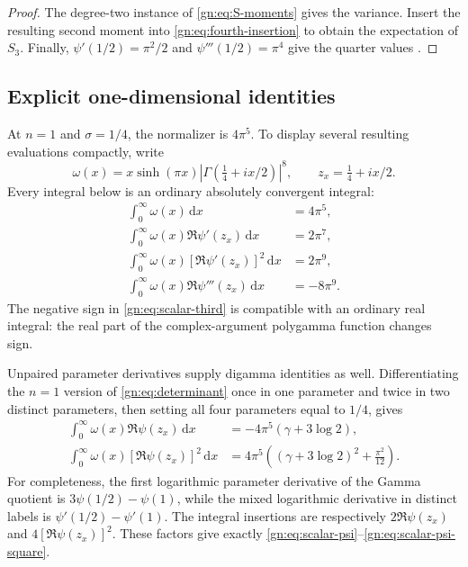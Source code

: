 \documentclass[11pt,a4paper]{article}
\numberwithin{equation}{section}
\theoremstyle{definition}
\theoremstyle{remark}
\newcommand{\dd}{\,\mathrm d}
\begin{document}
\begin{proof}
The degree-two instance of \eqref{gn:eq:S-moments} gives the variance.
Insert the resulting second moment into
\eqref{gn:eq:fourth-insertion} to obtain the expectation of $S_3$.
Finally, $\psi'(1/2)=\pi^2/2$ and $\psi'''(1/2)=\pi^4$ give the
quarter values \cite{dlmfpolygamma}.
\end{proof}

\subsection{Explicit one-dimensional identities}

At $n=1$ and $\sigma=1/4$, the normalizer is $4\pi^5$.  To display
several resulting evaluations compactly, write
\[
 \omega(x)=x\sinh(\pi x)|\Gamma(\tfrac14+ix/2)|^8,
 \qquad z_x=\tfrac14+ix/2.
\]
Every integral below is an ordinary absolutely convergent integral:
\begin{align}
 \int_0^\infty\omega(x)\dd x&=4\pi^5,
          \label{gn:eq:scalar-normalizer}\\
 \int_0^\infty\omega(x)\Re\psi'(z_x)\dd x&=2\pi^7,
          \label{gn:eq:scalar-trigamma}\\
 \int_0^\infty\omega(x)[\Re\psi'(z_x)]^2\dd x&=2\pi^9,
          \label{gn:eq:scalar-trigamma-square}\\
 \int_0^\infty\omega(x)\Re\psi'''(z_x)\dd x&=-8\pi^9.
          \label{gn:eq:scalar-third}
\end{align}
The negative sign in \eqref{gn:eq:scalar-third} is compatible with an
ordinary real integral: the real part of the complex-argument
polygamma function changes sign.

Unpaired parameter derivatives supply digamma identities as well.
Differentiating the $n=1$ version of
\eqref{gn:eq:determinant} once in one parameter and twice in two
distinct parameters, then setting all four parameters equal to $1/4$,
gives
\begin{align}
 \int_0^\infty\omega(x)\Re\psi(z_x)\dd x
    &=-4\pi^5(\gamma+3\log2),\label{gn:eq:scalar-psi}\\
 \int_0^\infty\omega(x)[\Re\psi(z_x)]^2\dd x
    &=4\pi^5\left((\gamma+3\log2)^2+\frac{\pi^2}{12}\right).
       \label{gn:eq:scalar-psi-square}
\end{align}
For completeness, the first logarithmic parameter derivative of the
Gamma quotient is $3\psi(1/2)-\psi(1)$, while the mixed logarithmic
derivative in distinct labels is $\psi'(1/2)-\psi'(1)$.  The integral
insertions are respectively $2\Re\psi(z_x)$ and
$4[\Re\psi(z_x)]^2$.  These factors give exactly
\eqref{gn:eq:scalar-psi}--\eqref{gn:eq:scalar-psi-square}.
\end{document}
